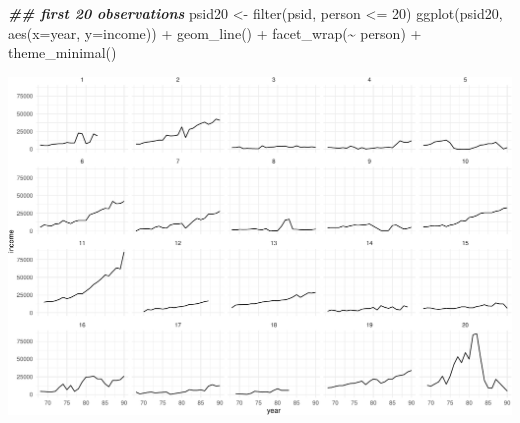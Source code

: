 \documentclass[
  ignorenonframetext,
]{beamer}
\newenvironment{Shaded}{\begin{snugshade}}{\end{snugshade}}
\newcommand{\AttributeTok}[1]{\textcolor[rgb]{0.77,0.63,0.00}{#1}}
\newcommand{\DecValTok}[1]{\textcolor[rgb]{0.00,0.00,0.81}{#1}}
\newcommand{\DocumentationTok}[1]{\textcolor[rgb]{0.56,0.35,0.01}{\textbf{\textit{#1}}}}
\newcommand{\FunctionTok}[1]{\textcolor[rgb]{0.00,0.00,0.00}{#1}}
\newcommand{\NormalTok}[1]{#1}
\newcommand{\OtherTok}[1]{\textcolor[rgb]{0.56,0.35,0.01}{#1}}
\newcommand{\SpecialCharTok}[1]{\textcolor[rgb]{0.00,0.00,0.00}{#1}}
\begin{document}
\begin{frame}[fragile]{}
\protect\hypertarget{section-19}{}
\tiny

\begin{Shaded}
\begin{Highlighting}[]
\DocumentationTok{\#\# first 20 observations}
\NormalTok{psid20 }\OtherTok{\textless{}{-}} \FunctionTok{filter}\NormalTok{(psid, person }\SpecialCharTok{\textless{}=} \DecValTok{20}\NormalTok{)}
\FunctionTok{ggplot}\NormalTok{(psid20, }\FunctionTok{aes}\NormalTok{(}\AttributeTok{x=}\NormalTok{year, }\AttributeTok{y=}\NormalTok{income)) }\SpecialCharTok{+} 
  \FunctionTok{geom\_line}\NormalTok{() }\SpecialCharTok{+} \FunctionTok{facet\_wrap}\NormalTok{(}\SpecialCharTok{\textasciitilde{}}\NormalTok{ person) }\SpecialCharTok{+} \FunctionTok{theme\_minimal}\NormalTok{()}
\end{Highlighting}
\end{Shaded}

\includegraphics{week11p2_files/figure-beamer/unnamed-chunk-14-1.pdf}
\end{frame}
\end{document}
